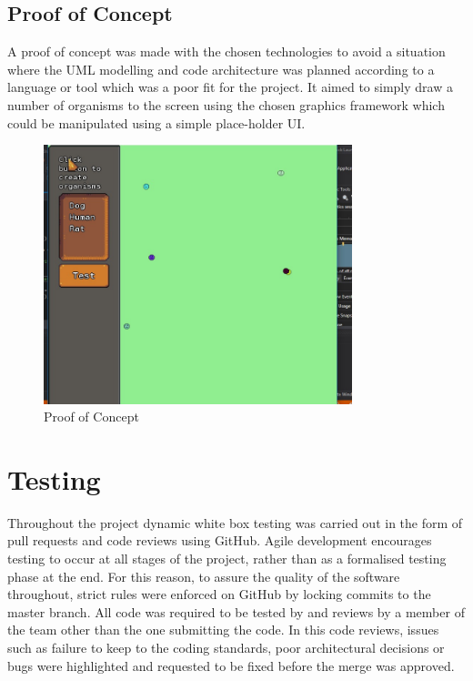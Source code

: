 \documentclass[a4paper, oneside, 11pt]{report}
\begin{document}
\section{Proof of Concept}
A proof of concept was made with the chosen technologies to avoid a situation where the UML modelling and code architecture was planned according to a language or tool which was a poor fit for the project. It aimed to simply draw a number of organisms to the screen using the chosen graphics framework which could be manipulated using a simple place-holder UI.

\begin{figure}[H]
	\caption{Proof of Concept}\label{poc}
	\centering
	\includegraphics[width=0.8\textwidth]{poc}
\end{figure}

\chapter{Testing}\label{testing}
Throughout the project dynamic white box testing was carried out in the form of pull requests and code reviews using GitHub. Agile development encourages testing to occur at all stages of the project, rather than as a formalised testing phase at the end. For this reason, to assure the quality of the software throughout, strict rules were enforced on GitHub by locking commits to the master branch. All code was required to be tested by and reviews by a member of the team other than the one submitting the code. In this code reviews, issues such as failure to keep to the coding standards, poor architectural decisions or bugs were highlighted and requested to be fixed before the merge was approved.
\end{document}
